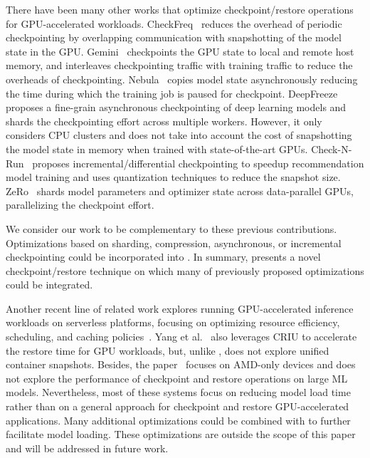  There have been many other works that optimize checkpoint/restore operations for GPU-accelerated workloads.
CheckFreq~\cite{mohan2021checkfreq} reduces the overhead of periodic checkpointing by overlapping communication with snapshotting of the model state in the GPU. 
Gemini~\cite{team2024gemini} checkpoints the GPU state to local and remote host memory, and interleaves checkpointing traffic with training traffic to reduce the overheads of checkpointing. 
Nebula~\cite{microsoft2024boost} copies model state asynchronously reducing the time during which the training job is paused for checkpoint. 
DeepFreeze~\cite{nicolae2020deepfreeze} proposes a fine-grain asynchronous checkpointing of deep learning models and shards the checkpointing effort across multiple workers. However, it only considers CPU clusters and does not take into account the cost of snapshotting the model state in memory when trained with state-of-the-art GPUs.
Check-N-Run~\cite{eisenman2022check} proposes incremental/differential checkpointing to speedup recommendation model training and uses quantization techniques to reduce the snapshot size.
ZeRo~\cite{rajbhandari2020zero} shards model parameters and optimizer state across data-parallel GPUs, parallelizing the checkpoint effort.

We consider our work to be complementary to these previous contributions. Optimizations based on sharding, compression, asynchronous, or incremental checkpointing could be incorporated into \sys. In summary, \sys presents a novel checkpoint/restore technique on which many of previously proposed optimizations could be integrated.

Another recent line of related work explores running GPU-accelerated inference workloads on serverless platforms, focusing on optimizing resource efficiency, scheduling, and caching policies~\cite{10.5555/3433701.3433792,280768,ishakian2018serving,280704,10.1145/3620678.3624664,infaas,10.1145/3503222.3507709,234998,yang2024on-demand}. Yang et al.~\cite{yang2024on-demand} also leverages CRIU to accelerate the restore time for GPU workloads, but, unlike \sys, does not explore unified container snapshots. Besides, the paper~\cite{yang2024on-demand} focuses on AMD-only devices and does not explore the performance of checkpoint and restore operations on large ML models.
Nevertheless, most of these systems focus on reducing model load time rather than on a general approach for checkpoint and restore GPU-accelerated applications. Many additional optimizations could be combined with \sys to further facilitate model loading. These optimizations are outside the scope of this paper and will be addressed in future work.

